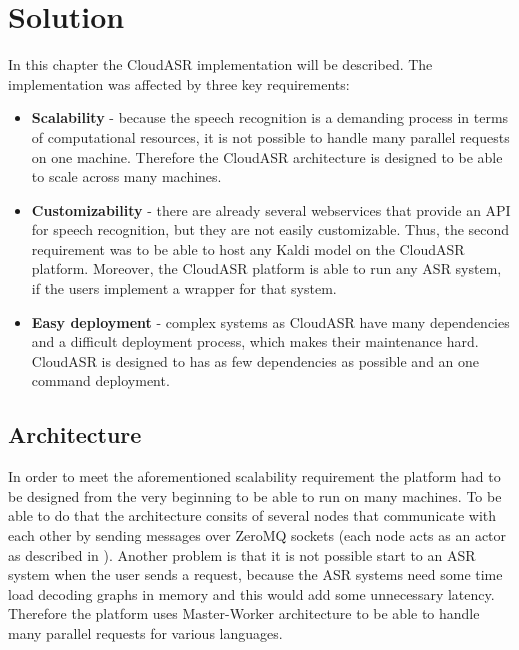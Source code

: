 \chapter{Solution}
In this chapter the CloudASR implementation will be described.
The implementation was affected by three key requirements:

\begin{itemize}
  \item
    \textbf{Scalability} -
      because the speech recognition is a demanding process in terms of computational resources,
        it is not possible to handle many parallel requests on one machine.
      Therefore the CloudASR architecture is designed to be able to scale across many machines.

  \item
    \textbf{Customizability} -
       there are already several webservices that provide an API for speech recognition,
         but they are not easily customizable.
       Thus, the second requirement was to be able to host any Kaldi model on  the CloudASR platform.
       Moreover, the CloudASR platform is able to run any ASR system,
         if the users implement a wrapper for that system.

  \item
    \textbf{Easy deployment} -
      complex systems as CloudASR have many dependencies and a difficult deployment process,
        which makes their maintenance hard.
      CloudASR is designed to has as few dependencies as possible and an one command deployment.

\end{itemize}



\section{Architecture}
In order to meet the aforementioned scalability requirement
  the platform had to be designed from the very beginning to be able to run on many machines.
To be able to do that the architecture consits of several nodes
  that communicate with each other by sending messages over ZeroMQ sockets
  (each node acts as an actor as described in \cite{hewitt1977viewing}).
Another problem is that it is not possible start to an ASR system when the user sends a request,
  because the ASR systems need some time load decoding graphs in memory
  and this would add some unnecessary latency.
Therefore the platform uses Master-Worker architecture to be able to handle many parallel requests for various languages.


